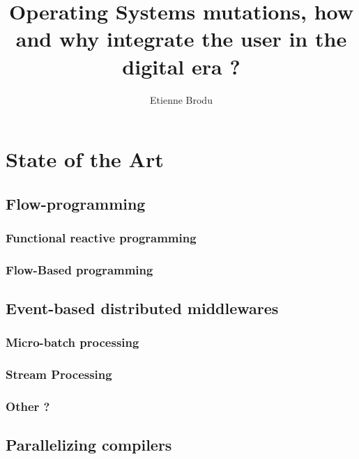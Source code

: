 \documentclass[12pt]{report}
\begin{document}
\title{Operating Systems mutations, how and why integrate the user in the digital era ?\\}
\author{Etienne Brodu}

\maketitle



\tableofcontents




\chapter{State of the Art}
  \section{Flow-programming}
    \subsection{Functional reactive programming}
    \subsection{Flow-Based programming}
  \section{Event-based distributed middlewares}
    \subsection{Micro-batch processing}
    \subsection{Stream Processing}
    \subsection{ Other ?}
  \section{Parallelizing compilers}
    \subsection{}
\end{document}
